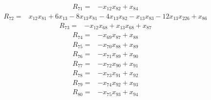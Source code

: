 \begin{equation*}\begin{split}
R_{71}={}&-x_{12} x_{82} + x_{84}
\end{split}\end{equation*}
\begin{equation*}\begin{split}
R_{72}={}&x_{12} x_{81} + 6x_{13} - 8x_{13} x_{81} - 4x_{13} x_{82} - x_{13} x_{83} - 12x_{13} x_{226} + x_{86}
\end{split}\end{equation*}
\begin{equation*}\begin{split}
R_{73}={}&-x_{12} x_{68} + x_{13} x_{68} + x_{87}
\end{split}\end{equation*}
\begin{equation*}\begin{split}
R_{74}={}&-x_{69} x_{87} + x_{88}
\end{split}\end{equation*}
\begin{equation*}\begin{split}
R_{75}={}&-x_{70} x_{88} + x_{89}
\end{split}\end{equation*}
\begin{equation*}\begin{split}
R_{76}={}&-x_{71} x_{89} + x_{90}
\end{split}\end{equation*}
\begin{equation*}\begin{split}
R_{77}={}&-x_{72} x_{90} + x_{91}
\end{split}\end{equation*}
\begin{equation*}\begin{split}
R_{78}={}&-x_{73} x_{91} + x_{92}
\end{split}\end{equation*}
\begin{equation*}\begin{split}
R_{79}={}&-x_{74} x_{92} + x_{93}
\end{split}\end{equation*}
\begin{equation*}\begin{split}
R_{80}={}&-x_{75} x_{93} + x_{94}
\end{split}\end{equation*}
